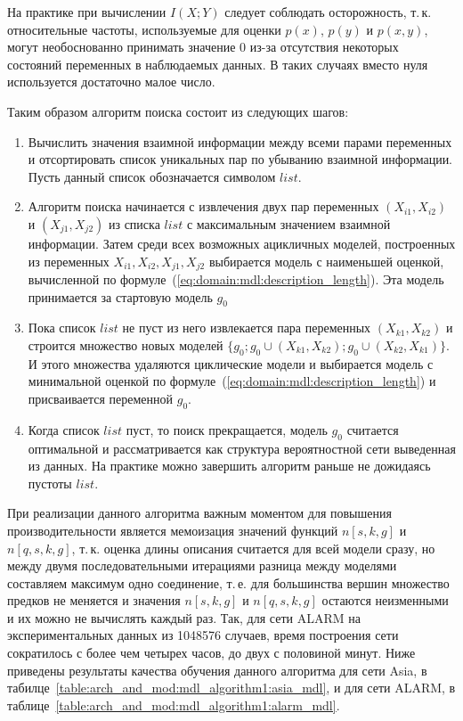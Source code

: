 На практике при вычислении $I(X; Y)$ следует соблюдать осторожность, т.\,к. относительные частоты, используемые для оценки $p(x)$, $p(y)$ и $p(x, y)$, могут необоснованно принимать значение \num{0} из-за отсутствия некоторых состояний переменных в наблюдаемых данных.
В таких случаях вместо нуля используется достаточно малое число.

Таким образом алгоритм поиска состоит из следующих шагов:
\begin{enumerate}
  \item Вычислить значения взаимной информации между всеми парами переменных и отсортировать список уникальных пар по убыванию взаимной информации.
  Пусть данный список обозначается символом $list$.
  \item Алгоритм поиска начинается с извлечения двух пар переменных $(X_{i1}, X_{i2})$ и $(X_{j1}, X_{j2})$ из списка $list$ с максимальным значением взаимной информации.
  Затем среди всех возможных ацикличных моделей, построенных из переменных $ X_{i1}, X_{i2}, X_{j1}, X_{j2} $ выбирается модель с наименьшей оценкой, вычисленной по формуле~(\ref{eq:domain:mdl:description_length}).
  Эта модель принимается за стартовую модель $g_0$
  \item Пока список $list$ не пуст из него извлекается пара переменных $(X_{k1}, X_{k2})$ и строится множество новых моделей $\{g_0; g_0 \cup (X_{k1}, X_{k2}); g_0 \cup (X_{k2}, X_{k1})\} $.
  И этого множества удаляются циклические модели и выбирается модель с минимальной оценкой по формуле~(\ref{eq:domain:mdl:description_length}) и присваивается переменной $g_0$.
  \item Когда список $list$ пуст, то поиск прекращается, модель $g_0$ считается оптимальной и рассматривается как структура вероятностной сети выведенная из данных.
  На практике можно завершить алгоритм раньше не дожидаясь пустоты $list$.
\end{enumerate}

При реализации данного алгоритма важным моментом для повышения производительности является мемоизация значений функций $n[s, k, g]$ и $n[q, s, k, g]$, т.\,к. оценка длины описания считается для всей модели сразу, но между двумя последовательными итерациями разница между моделями составляем максимум одно соединение, т.\,е. для большинства вершин множество предков не меняется и значения $n[s, k, g]$ и $n[q, s, k, g]$ остаются неизменными и их можно не вычислять каждый раз.
Так, для сети ALARM на экспериментальных данных из \num{1048576} случаев, время построения сети сократилось с более чем четырех часов, до двух с половиной минут.
Ниже приведены результаты качества обучения данного алгоритма для сети Asia, в табилце~\ref{table:arch_and_mod:mdl_algorithm1:asia_mdl}, и для сети ALARM, в таблице~\ref{table:arch_and_mod:mdl_algorithm1:alarm_mdl}.

